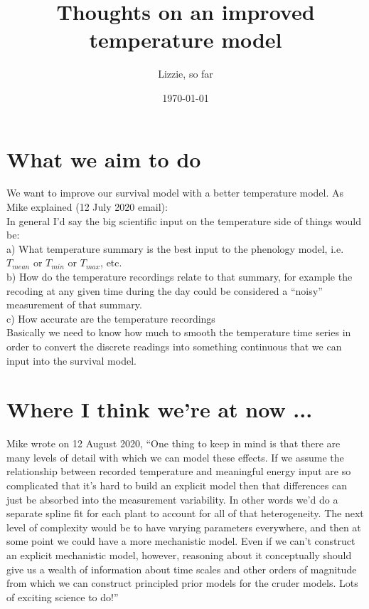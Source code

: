 \documentclass[11pt,letter]{article}
\begin{document}
\title{Thoughts on an improved temperature model}
\author{Lizzie, so far}
\date{\today}
\maketitle
\tableofcontents

\newpage
\section{What we aim to do}
We want to improve our survival model with a better temperature model. As Mike explained (12 July 2020 email):\\

In general I'd say the big scientific input on the temperature side of things 
would be:\\

a) What temperature summary is the best input to the phenology model, 
    i.e. $T_{mean}$ or $T_{min}$ or $T_{max}$, etc.\\
b) How do the temperature recordings relate to that summary, for example 
    the recoding at any given time during the day could be considered a ``noisy'' 
    measurement of that summary.\\
c) How accurate are the temperature recordings\\

Basically we need to know how much to smooth the temperature time 
series in order to convert the discrete readings into something continuous 
that we can input into the survival model.


\section{Where I think we're at now ...}

Mike wrote on 12 August 2020, ``One thing to keep in mind is that there are many levels of detail with which we can model 
these effects.  If we assume the relationship between recorded temperature and meaningful
energy input are so complicated that it’s hard to build an explicit model then that differences 
can just be absorbed into the measurement variability.  In other words we’d do a separate 
spline fit for each plant to account for all of that heterogeneity.  The next level of  complexity 
would be to have varying parameters everywhere, and then at some point we could have a 
more mechanistic model.  Even if we can’t construct an explicit mechanistic model, however,
reasoning about it conceptually should give us a wealth of information about time scales and
other orders of magnitude from which we can construct principled prior models for the cruder
models.  Lots of exciting science to do!''\\
\end{document}
